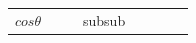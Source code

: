 \begin{center}
\begin{xtabular*}{\mytablewidth}[t]{|p{10\mystarwidth}|p{10\mystarwidth}|p{10\mystarwidth}|p{10\mystarwidth}|p{10\mystarwidth}|p{10\mystarwidth}|p{10\mystarwidth}|p{10\mystarwidth}|}
    
        
                  \begin{math}cos\theta \end{math}
                 &
    
    
         &
    
    
         &subsub
    
    
         &
    
    
         &
    
    
         &
    
    
         &
    
    

\end{xtabular*}
\end{center}
